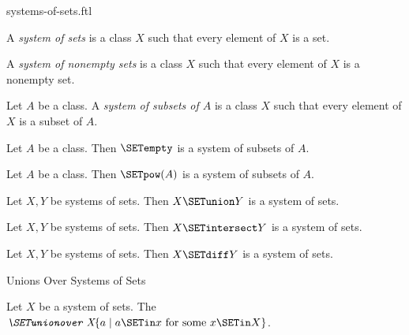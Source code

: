 \documentclass{naproche-library}
\begin{document}
\begin{smodule}[title=Systems of Sets]{systems-of-sets.ftl}


\begin{definition}[forthel,id=FOUNDATIONS_10_5805323570905088]
  A \emph{system of sets} is a class $X$ such that every element of $X$ is a set.
\end{definition}

\begin{definition}[forthel,id=FOUNDATIONS_10_1631952387964928]
  A \emph{system of nonempty sets} is a class $X$ such that every element of $X$ is a nonempty set.
\end{definition}

\begin{definition}[forthel,id=FOUNDATIONS_10_943381479948288]
  Let $A$ be a class.
  A \emph{system of subsets of $A$} is a class $X$ such that every element of $X$ is a subset of $A$.
\end{definition}

\begin{proposition}[forthel,id=FOUNDATIONS_10_8268633648136192]
  Let $A$ be a class.
  Then $\SETempty$ is a system of subsets of $A$.
\end{proposition}

\begin{proposition}[forthel,id=FOUNDATIONS_10_7546016869908480]
  Let $A$ be a class.
  Then $\SETpow(A)$ is a system of subsets of $A$.
\end{proposition}

\begin{proposition}
  Let $X, Y$ be systems of sets.
  Then $X \SETunion Y$ is a system of sets.
\end{proposition}

\begin{proposition}
  Let $X, Y$ be systems of sets.
  Then $X \SETintersect Y$ is a system of sets.
\end{proposition}

\begin{proposition}
  Let $X, Y$ be systems of sets.
  Then $X \SETdiff Y$ is a system of sets.
\end{proposition}

\begin{sfragment}{Unions Over Systems of Sets}
  \begin{definition}[forthel,id=FOUNDATIONS_10_541772562300928]
    Let $X$ be a system of sets.
    The $\emph{\SETunionover X} \{ a \mid a \SETin x\text{ for some }x \SETin X \}$.


\end{definition}
\end{sfragment}
\end{smodule}
\end{document}

